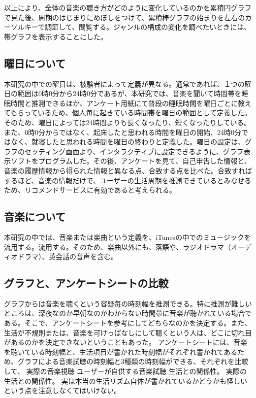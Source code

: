 \documentclass{jsarticle}
\begin{document}
以上により、全体の音楽の聴き方がどのように変化しているのかを累積円グラフで見た後、周期のはじまりにめぼしをつけて、累積棒グラフの始まりを左右のカーソルキーで調節して、閲覧する。ジャンルの構成の変化を調べたいときには、帯グラフを表示することにした。

\subsection{曜日について}
本研究の中での曜日は、被験者によって定義が異なる。通常であれば、１つの曜日の範囲は0時0分から24時0分であるが、本研究では、音楽を聞いて時間帯を睡眠時間と推測できるほか、アンケート用紙にて普段の睡眠時間を曜日ごとに教えてもらっているため、個人毎に起きている時間帯を曜日の範囲として定義した。そのため、曜日によっては24時間よりも長くなったり、短くなったりしている。また、0時0分からではなく、起床したと思われる時間を曜日の開始、24時0分ではなく、就寝したと思われる時間を曜日の終わりと定義した。曜日の設定は、グラフのセッティング画面より、インタラクティブに設定できるように、グラフ表示ソフトをプログラムした。その後、アンケートを見て、自己申告した情報と、音楽の履歴情報から得られた情報と異なる点、合致する点を比べた。合致すればするほど、音楽の情報だけで、ユーザーの生活周期を推測できているとみなせるため、リコメンドサービスに有効であると考えられる。

\subsection{音楽について}
本研究の中では、音楽または楽曲という定義を、iTunesの中でのミュージックを流用する。流用する。そのため、楽曲以外にも、落語や、ラジオドラマ（オーディオドラマ）、英会話の音声を含む。

\subsection{グラフと、アンケートシートの比較}
グラフからは音楽を聴くという容疑毎の時刻幅を推測できる。特に推測が難しいところは、深夜なのか早朝なのかわからない時間帯に音楽が聴かれている場合である。そこで、アンケートシートを参考にしてどちらなのかを決定する。また、生活が不規則または、音楽を可けっぱなしにして聴くという人は、どこに切れ目があるのかを決定できないということもあった。
アンケートシートには、音楽を聴いている時刻幅と、生活項目が書かれた時刻幅がそれぞれ書かれてあるため、グラフによる音楽試聴の時刻幅と3種類の時刻幅ができる、それぞれを比較して、
実際の音楽視聴
ユーザーが自供する音楽試聴
生活との関係性。
実際の生活との関係性。
	実は本当の生活リズム自体が書かれているかどうかも怪しいという点を注意しなくてはいけない。
	
\end{document}
